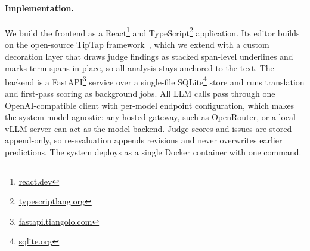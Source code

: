 \paragraph{Implementation.}
We build the frontend as a React\footnote{\href{https://react.dev}{react.dev}}
and TypeScript\footnote{\href{https://www.typescriptlang.org}{typescriptlang.org}}
application. Its editor builds on the open-source TipTap
framework~\cite{tiptap}, which we extend with a custom decoration layer that
draws judge findings as stacked span-level underlines and marks term spans in
place, so all analysis stays anchored to the text. The backend is a
FastAPI\footnote{\href{https://fastapi.tiangolo.com}{fastapi.tiangolo.com}}
service over a single-file
SQLite\footnote{\href{https://sqlite.org}{sqlite.org}} store and runs
translation and first-pass scoring as background jobs.
All LLM calls pass through one OpenAI-compatible client with per-model
endpoint configuration, which makes the system model agnostic: any hosted
gateway, such as OpenRouter, or a local vLLM server can act as the model
backend. Judge scores and issues are stored append-only, so re-evaluation
appends revisions and never overwrites earlier predictions. The system
deploys as a single Docker container with one command.

